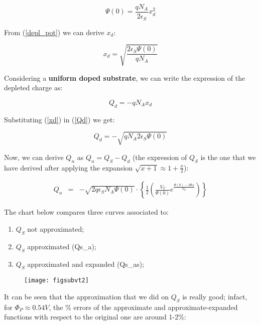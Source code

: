\documentclass[a4paper, 12pt, twoside, openright]{report}
\begin{document}
\begin{equation}
\Psi(0) = \frac{qN_A}{2 \epsilon_S} x_d^2
\label{depl_pot}
\end{equation}

From (\ref{depl_pot}) we can derive $x_{d}$:

\begin{equation}
x_d = \sqrt{\frac{2 \epsilon_S \Psi(0)}{qN_A}}
\label{xd}
\end{equation}

Considering a \textbf{uniform doped substrate}, we can write the expression of the depleted charge as:

\begin{equation}
Q_d = -q N_A x_d
\label{Qd}
\end{equation}

Substituting (\ref{xd}) in (\ref{Qd}) we get:

\begin{equation}
Q_d = -\sqrt{q N_A 2 \epsilon_S \Psi(0)}
\label{}
\end{equation}

Now, we can derive $Q_{n}$ as $Q_n = Q_S - Q_d$ (the expression of $Q_{S}$ is the one that we have derived after applying the expansion $\sqrt{x+1} \approx 1+ \frac{x}{2}$):

  \begin{eqnarray*}
      Q_n &=&-\sqrt{2q \epsilon_S N_A \Psi(0)} \cdot \left\{\frac{1}{2}\left( \frac{V_T}{\Psi(0)} e^{\displaystyle 			\frac{\Psi(0)-2\Phi_P}{V_T}}\right) \right\}
  \end{eqnarray*}

The chart below compares three curves associated to:

\begin{enumerate}
\item $Q_{S}$ not approximated;
\item $Q_{S}$ approximated (Qs\_a);
\item $Q_{S}$ approximated and expanded (Qs\_as);
\end{enumerate}

	\begin{figure}[H]
	\centering
	\texttt{[image: figsubvt2]}
	\caption{}
	\label{}
	\end{figure}

It can be seen that the approximation that we did on $Q_{S}$ is really good; infact, for $\Phi_P \approx 0.54 V$, the \% errors of the approximate and approximate-expanded functions with respect to the original one are around 1-2\%:
\end{document}
